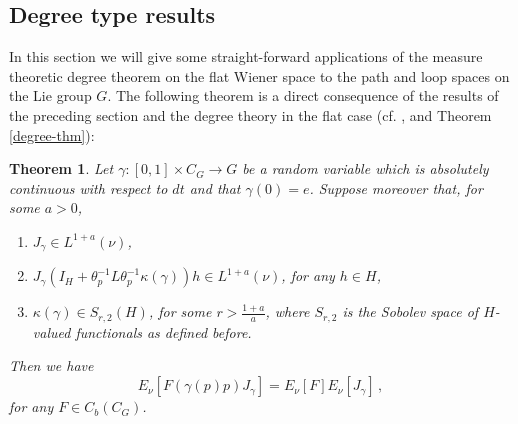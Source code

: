 \documentclass[12pt,a4paper]{book}
\newtheorem{theorem}{Theorem}[section]
\begin{document}
\subsection{Degree type results}
In this section we will give some straight-forward applications of the measure
theoretic degree theorem on the flat Wiener space to the path and loop spaces
on the Lie group $G$. The following theorem is a direct consequence of
the results of the preceding section  and the degree theory in the
flat case (cf. \cite{UZ5,UZ6},  \cite{UZ7} and Theorem \ref{degree-thm}):
\begin{theorem}
\label{lie-deg-thm}
Let $\gamma:[0,1]\times C_G\rightarrow G$ be a random variable which is
absolutely continuous with respect to $dt$ and that $\gamma(0)=e$. Suppose
moreover that, for some $a>0$,
\begin{enumerate}
\item $J_\gamma\in L^{1+a}(\nu)$,
\item $J_\gamma\left(I_H+\theta_p^{-1}L\theta_p^{-1}\kappa(\gamma)\right)h\in
  L^{1+a}(\nu)$, for any $h\in H$,
\item $\kappa(\gamma)\in S_{r,2}(H)$, for some $r>\frac{1+a}{a}$,
  where $S_{r,2}$ is the Sobolev space of $H$-valued functionals as defined
   before.
\end{enumerate}
Then we have
$$
E_\nu[F(\gamma(p)p)J_\gamma]=E_\nu[F]E_\nu[J_\gamma]\,,
$$
for any $F\in C_b(C_G)$.
\end{theorem}
\end{document}
